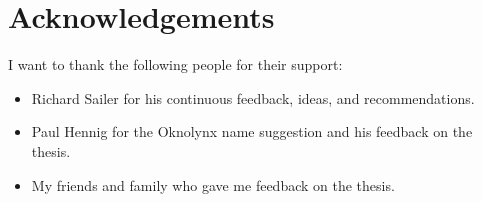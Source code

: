\chapter{Acknowledgements}
\label{app:acknowledgements}
I want to thank the following people for their support:
\begin{itemize}
	\item Richard Sailer for his continuous feedback, ideas, and recommendations.
	\item Paul Hennig for the Oknolynx name suggestion and his feedback on the thesis.
	\item My friends and family who gave me feedback on the thesis.
\end{itemize}
